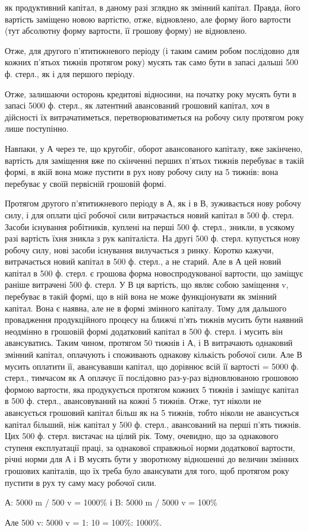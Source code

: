 як продуктивний капітал, в даному разі зглядно як змінний капітал.
Правда, його вартість заміщено новою вартістю, отже, відновлено, але
форму його вартости (тут абсолютну форму вартости, її грошову форму)
не відновлено.

Отже, для другого п’ятитижневого періоду (і таким самим робом
послідовно для кожних п’ятьох тижнів протягом року) мусять так
само бути в запасі дальші 500 ф. стерл., як і для першого періоду.

Отже, залишаючи осторонь кредитові відносини, на початку року мусять
бути в запасі 5000 ф. стерл., як латентний авансований грошовий капітал,
хоч в дійсності їх витрачатиметься, перетворюватиметься на робочу
силу протягом року лише поступінно.

Навпаки, у А через те, що кругобіг, оборот авансованого капіталу,
вже закінчено, вартість для заміщення вже по скінченні перших п’ятьох
тижнів перебуває в такій формі, в якій вона може пустити в рух нову
робочу силу на 5 тижнів: вона перебуває у своїй первісній грошовій формі.

Протягом другого п’ятитижневого періоду в А, як і в В, зуживається
нову робочу силу, і для оплати цієї робочої сили витрачається новий капітал
в 500 ф. стерл. Засоби існування робітників, куплені на перші 500 ф.
стерл., зникли, в усякому разі вартість їхня зникла з рук капіталіста.
На другі 500 ф. стерл. купується нову робочу силу, нові засоби існування
вилучається з ринку. Коротко кажучи, витрачається новий капітал в 500 ф.
стерл., а не старий. Але в А цей новий капітал в 500 ф. стерл. є грошова
форма новоспродукованої вартости, що заміщує раніше витрачені 500 ф.
стерл. У В ця вартість, що являє собою заміщення v, перебуває в такій
формі, що в ній вона не може функціонувати як змінний капітал. Вона є
наявна, але не в формі змінного капіталу. Тому для дальшого провадження
продукційного процесу на ближчі п’ять тижнів мусить бути наявний неодмінно
в грошовій формі додатковий капітал в 500 ф. стерл. і мусить він авансуватись.
Таким чином, протягом 50 тижнів і А, і В витрачають однаковий
змінний капітал, оплачують і споживають однакову кількість робочої сили.
Але В мусить оплатити її, авансувавши капітал, що дорівнює всій її
вартості = 5000 ф. стерл., тимчасом як А оплачує її послідовно раз-у-раз
відновлюваною грошовою формою вартости, яка продукується протягом
кожних 5 тижнів і заміщує капітал в 500 ф. стерл., авансовуваний на кожні
5 тижнів. Отже, тут ніколи не авансується грошовий капітал більш як
на 5 тижнів, тобто ніколи не авансується капітал більший, ніж капітал
у 500 ф. стерл., авансований на перші п’ять тижнів. Цих 500 ф. стерл. вистачає
на цілий рік. Тому, очевидно, що за однакового ступеня експлуатації
праці, за однакової справжньої норми додаткової вартости, річні
норми для А і В мусять бути у зворотному відношенні до величин змінних
грошових капіталів, що їх треба було авансувати для того, щоб
протягом року пустити в рух ту саму масу робочої сили.

А: 5000 m / 500 v = 1000\% і B: 5000 m / 5000 v = 100\%

Але 500 v: 5000 v = 1: 10 = 100\%: 1000\%.
